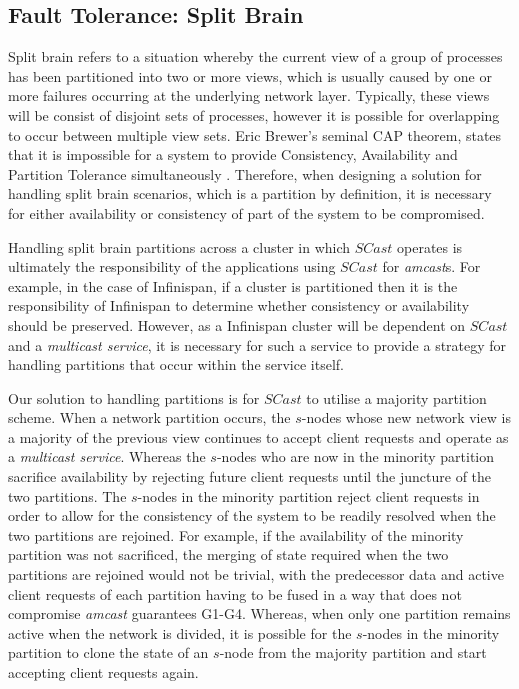     \subsection{Fault Tolerance: Split Brain}
    Split brain refers to a situation whereby the current view of a group of processes has been partitioned into two or more views, which is usually caused by one or more failures occurring at the underlying network layer. Typically, these views will be consist of disjoint sets of processes, however it is possible for overlapping to occur between multiple view sets.  Eric Brewer's seminal CAP theorem, states that it is impossible for a system to provide Consistency, Availability and Partition Tolerance simultaneously \citep{Brewer:2000:TRD:343477.343502,6133253, Gilbert:2002:BCF:564585.564601}.  Therefore, when designing a solution for handling split brain scenarios, which is a partition by definition, it is necessary for either availability or consistency of part of the system to be compromised.  
    
    Handling split brain partitions across a cluster in which $SCast$ operates is ultimately the responsibility of the applications using $SCast$ for \emph{amcast}s.  For example, in the case of Infinispan, if a cluster is partitioned then it is the responsibility of Infinispan to determine whether consistency or availability should be preserved.  However, as a Infinispan cluster will be dependent on $SCast$ and a \emph{multicast service}, it is necessary for such a service to provide a strategy for handling partitions that occur within the service itself.  
    
    Our solution to handling partitions is for $SCast$ to utilise a majority partition scheme.  When a network partition occurs, the $s$-nodes whose new network view is a majority of the previous view continues to accept client requests and operate as a \emph{multicast service}.  Whereas the $s$-nodes who are now in the minority partition sacrifice availability by rejecting future client requests until the juncture of the two partitions.  The $s$-nodes in the minority partition reject client requests in order to allow for the consistency of the system to be readily resolved when the two partitions are rejoined.  For example, if the availability of the minority partition was not sacrificed, the merging of state required when the two partitions are rejoined would not be trivial, with the predecessor data and active client requests of each partition having to be fused in a way that does not compromise \emph{amcast} guarantees G1-G4.  Whereas, when only one partition remains active when the network is divided, it is possible for the $s$-nodes in the minority partition to clone the state of an $s$-node from the majority partition and start accepting client requests again.  
    

